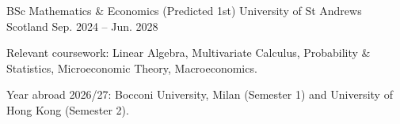 

\begin{cventries}

  \cventry
    {BSc Mathematics \& Economics (Predicted 1st)} %
    {University of St Andrews} %
    {Scotland} %
    {Sep. 2024 -- Jun. 2028} %
    {
      \begin{cvitems}
        \item {Relevant coursework: Linear Algebra, Multivariate Calculus, Probability \& Statistics, Microeconomic Theory, Macroeconomics.}
        \item {Year abroad 2026/27: Bocconi University, Milan (Semester 1) and University of Hong Kong (Semester 2).}
      \end{cvitems}
    }

\end{cventries}
